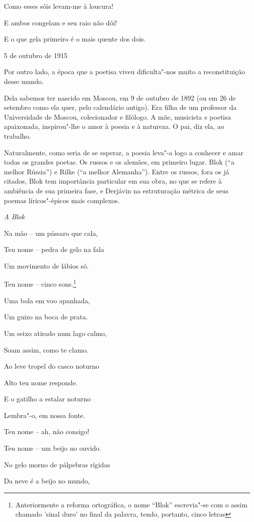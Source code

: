 Como esses sóis levam-me à loucura!

E ambos congelam e seu raio não dói!

E o que gela primeiro é o mais quente dos dois.

5 de outubro de 1915

Por outro lado, a época que a poetisa viveu dificulta"-nos muito a
reconstituição desse mundo.

Dela sabemos ter nascido em Moscou, em 9 de outubro de 1892 (ou em 26 de
setembro como ela quer, pelo calendário antigo). Era filha de um
professor da Universidade de Moscou, colecionador e filólogo. A mãe,
musicista e poetisa apaixonada, inspirou"-lhe o amor à poesia e à
natureza. O pai, diz ela, ao trabalho.

Naturalmente, como seria de se esperar, a poesia leva"-a logo a conhecer
e amar todas os grandes poetas. Os russos e os alemães, em primeiro
lugar. Blok (``a melhor Rússia'') e Rilke (``a melhor Alemanha''). Entre
os russos, fora os já citados, Blok tem importância particular em sua
obra, no que se refere à ambiência de sua primeira fase, e Derjávin na
estruturação métrica de seus poemas líricos"-épicos mais complexos.

\emph{A Blok}

Na mão -- um pássaro que cala,

Teu nome -- pedra de gelo na fala

Um movimento de lábios só.

Teu nome -- cinco sons.\footnote{Anteriormente a reforma ortográfica, o
  nome ``Blok'' escrevia"-se com o assim chamado 'sinal duro' no final da
  palavra, tendo, portanto, cinco letras}

Uma bola em voo apanhada,

Um guizo na boca de prata.

Um seixo atirado num lago calmo,

Soam assim, como te clamo.

Ao leve tropel do casco noturno

Alto teu nome responde.

E o gatilho a estalar noturno

Lembra"-o, em nossa fonte.

Teu nome -- ah, não consigo!

Teu nome -- um beijo no ouvido.

No gelo morno de pálpebras rígidas

Da neve é a beijo no mundo,

